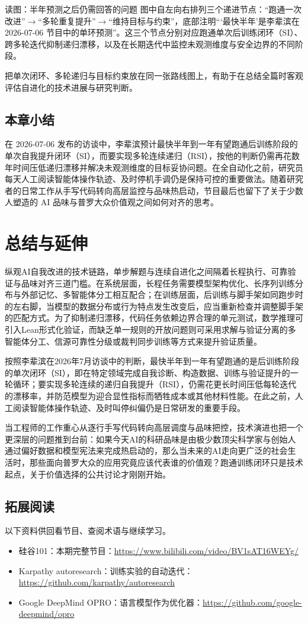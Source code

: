 \documentclass[UTF8,a4paper,11pt,fontset=fandol]{ctexart}
\begin{document}
\begin{knowledgebox}{读图：半年预测之后仍需回答的问题}
图中自左向右排列三个递进节点：“跑通一次改进”\ensuremath{\rightarrow}“多轮重复提升”\ensuremath{\rightarrow}“维持目标与约束”，底部注明“‘最快半年’是李辈滨在 2026-07-06 节目中的单环预测”。这三个节点分别对应跑通单次后训练闭环（SI）、跨多轮迭代抑制递归漂移，以及在长期迭代中监控未观测维度与安全边界的不同阶段。
\end{knowledgebox}
把单次闭环、多轮递归与目标约束放在同一张路线图上，有助于在总结全篇时客观评估自进化的技术进展与研究判断。
\subsection{本章小结}
在 2026-07-06 发布的访谈中，李辈滨预计最快半年到一年有望跑通后训练阶段的单次自我提升闭环（SI），而要实现多轮连续递归（RSI），按他的判断仍需再花数年时间压低递归漂移并解决未观测维度的目标妥协问题。在全自动化之前，研究员每天人工阅读智能体操作轨迹、及时停机手调仍是保持可控的重要做法。随着研究者的日常工作从手写代码转向高层监控与品味热启动，节目最后也留下了关于少数人塑造的 AI 品味与普罗大众价值观之间如何对齐的思考。
\needspace{.8\textheight}\section{总结与延伸}
纵观AI自我改进的技术链路，单步解题与连续自进化之间隔着长程执行、可靠验证与品味对齐三道门槛。在系统层面，长程任务需要模型架构优化、长序列训练分布与外部记忆、多智能体分工相互配合；在训练层面，后训练与脚手架如同跑步时的左右脚，当模型的数据分布或行为特点发生改变后，应当重新检查并调整脚手架的匹配方式。为了抑制递归漂移，代码任务依赖边界合理的单元测试，数学推理可引入Lean形式化验证，而缺乏单一规则的开放问题则可采用求解与验证分离的多智能体分工、信源可靠性分级或裁判同步训练等方式来提升验证质量。

按照李辈滨在2026年7月访谈中的判断，最快半年到一年有望跑通的是后训练阶段的单次闭环（SI），即在特定领域完成自我诊断、构造数据、训练与验证提升的一轮循环；要实现多轮连续的递归自我提升（RSI），仍需花更长时间压低每轮迭代的漂移率，并防范模型为迎合显性指标而牺牲成本或其他材料性能。在此之前，人工阅读智能体操作轨迹、及时叫停纠偏仍是日常研发的重要手段。

当工程师的工作重心从逐行手写代码转向高层调度与品味把控，技术演进也把一个更深层的问题推到台前：如果今天AI的科研品味是由极少数顶尖科学家与创始人通过偏好数据和模型宪法来完成热启动的，那么当未来的AI走向更广泛的社会生活时，那些面向普罗大众的应用究竟应该代表谁的价值观？跑通训练闭环只是技术起点，关于价值选择的公共讨论才刚刚开始。
\subsection{拓展阅读}
以下资料供回看节目、查阅术语与继续学习。
\begin{itemize}
\item 硅谷101：本期完整节目：\url{https://www.bilibili.com/video/BV1sAT16WEYg/}
\item Karpathy autoresearch：训练实验的自动迭代：\url{https://github.com/karpathy/autoresearch}
\item Google DeepMind OPRO：语言模型作为优化器：\url{https://github.com/google-deepmind/opro}
\end{itemize}
\end{document}
